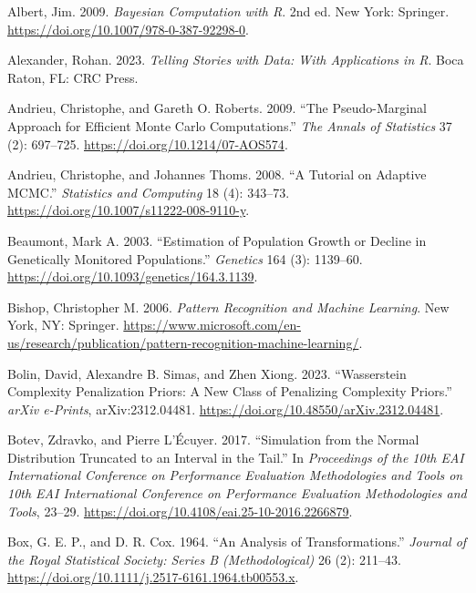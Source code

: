 \documentclass[
  11pt,
  letterpaper,
]{scrbook}
\newlength{\cslhangindent}
\newenvironment{CSLReferences}[2] %
 {\begin{list}{}{%
  \setlength{\itemindent}{0pt}
  \setlength{\leftmargin}{0pt}
  \setlength{\parsep}{0pt}
  \ifodd #1
   \setlength{\leftmargin}{\cslhangindent}
   \setlength{\itemindent}{-1\cslhangindent}
  \fi
  \setlength{\itemsep}{#2\baselineskip}}}
 {\end{list}}
\theoremstyle{definition}
\theoremstyle{definition}
\theoremstyle{definition}
\theoremstyle{plain}
\theoremstyle{plain}
\theoremstyle{plain}
\theoremstyle{remark}
\begin{document}
\label{refs}
\begin{CSLReferences}{1}{0}
Albert, Jim. 2009. \emph{Bayesian Computation with {R}}. 2nd ed. New
York: Springer. \url{https://doi.org/10.1007/978-0-387-92298-0}.

Alexander, Rohan. 2023. \emph{Telling Stories with Data: With
Applications in {R}}. Boca Raton, FL: CRC Press.

Andrieu, Christophe, and Gareth O. Roberts. 2009. {``The Pseudo-Marginal
Approach for Efficient {M}onte {C}arlo Computations.''} \emph{The Annals
of Statistics} 37 (2): 697--725.
\url{https://doi.org/10.1214/07-AOS574}.

Andrieu, Christophe, and Johannes Thoms. 2008. {``A Tutorial on Adaptive
{MCMC}.''} \emph{Statistics and Computing} 18 (4): 343--73.
\url{https://doi.org/10.1007/s11222-008-9110-y}.

Beaumont, Mark A. 2003. {``Estimation of Population Growth or Decline in
Genetically Monitored Populations.''} \emph{Genetics} 164 (3): 1139--60.
\url{https://doi.org/10.1093/genetics/164.3.1139}.

Bishop, Christopher M. 2006. \emph{Pattern Recognition and Machine
Learning}. New York, NY: Springer.
\url{https://www.microsoft.com/en-us/research/publication/pattern-recognition-machine-learning/}.

Bolin, David, Alexandre B. Simas, and Zhen Xiong. 2023. {``{W}asserstein
Complexity Penalization Priors: A New Class of Penalizing Complexity
Priors.''} \emph{arXiv e-Prints}, arXiv:2312.04481.
\url{https://doi.org/10.48550/arXiv.2312.04481}.

Botev, Zdravko, and Pierre L'Écuyer. 2017. {``Simulation from the Normal
Distribution Truncated to an Interval in the Tail.''} In
\emph{Proceedings of the 10th EAI International Conference on
Performance Evaluation Methodologies and Tools on 10th EAI International
Conference on Performance Evaluation Methodologies and Tools}, 23--29.
\url{https://doi.org/10.4108/eai.25-10-2016.2266879}.

Box, G. E. P., and D. R. Cox. 1964. {``An Analysis of
Transformations.''} \emph{Journal of the Royal Statistical Society:
Series B (Methodological)} 26 (2): 211--43.
\url{https://doi.org/10.1111/j.2517-6161.1964.tb00553.x}.


\end{CSLReferences}
\end{document}
